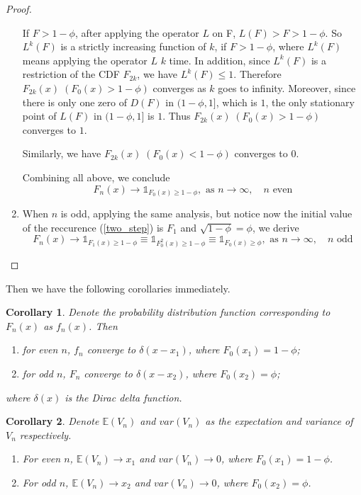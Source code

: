 \documentclass[a4paper,english]{article}
\newtheorem{col}{Corollary}[section]
\begin{document}
\begin{spacing}{1.4}
\begin{proof}
\begin{enumerate}
    If $F > 1 - \phi$, after applying the operator $L$ on F, $L(F) > F > 1 - \phi$. So $L^k (F)$ is a strictly increasing function of $k$, if $F > 1 - \phi$, where $L^k (F)$ means applying the operator $L$ $k$ time. In addition, since $L^k (F)$ is a restriction of the CDF $F_{2k}$, we have $L^k (F) \leq 1$. Therefore $F_{2k}(x) \; (F_0(x) > 1 - \phi)$ converges as $k$ goes to infinity.
    Moreover, since there is only one zero of $D(F)$ in $(1 - \phi, 1]$, which is $1$, the only stationary point of $L(F)$ in $(1 - \phi, 1]$ is $1$. Thus $F_{2k}(x) \; (F_0(x) > 1 - \phi)$ converges to $1$.

    Similarly, we have $F_{2k}(x) \; (F_0(x) < 1 - \phi)$ converges to $0$.

    Combining all above, we conclude
    \begin{equation}
      F_n(x) \to \mathds{1}_{F_0(x) \geq 1 - \phi}, \text{ as } n \to \infty, \quad \text{$n$ even}
    \end{equation}

    \item When $n$ is odd, applying the same analysis, but notice now the initial value of the reccurence (\ref{two_step}) is $F_1$ and $\sqrt{1-\phi} = \phi$, we derive
    \begin{equation}
      F_n(x) \to \mathds{1}_{F_1(x) \geq 1 - \phi} \equiv \mathds{1}_{F_0^2(x) \geq 1 - \phi} \equiv \mathds{1}_{F_0(x) \geq \phi}, \text{ as } n \to \infty, \quad \text{$n$ odd}
    \end{equation}

  \end{enumerate}
\end{proof}

Then we have the following corollaries immediately.
\begin{col}
  Denote the probability distribution function corresponding to $F_n(x)$ as $f_n(x)$. Then
  \begin{enumerate}
    \item for even $n$, $f_n$ converge to $\delta(x - x_1)$, where $F_0(x_1) = 1 - \phi$;
    \item for odd $n$, $F_n$ converge to $\delta(x - x_2)$, where $F_0(x_2) = \phi$;
  \end{enumerate}
  where $\delta(x)$ is the Dirac delta function.
\end{col}

\begin{col} Denote $\mathbb{E} (V_n)$ and $var(V_n)$ as the expectation and variance of $V_n$ respectively.
  \begin{enumerate}
    \item For even $n$, $\mathbb{E} (V_n) \to x_1$ and $var(V_n) \to 0$, where $F_0(x_1) = 1 - \phi$.
    \item For odd $n$, $\mathbb{E} (V_n) \to x_2$ and $var(V_n) \to 0$, where $F_0(x_2) = \phi$.
  \end{enumerate}
\end{col}


\end{spacing}
\end{document}
